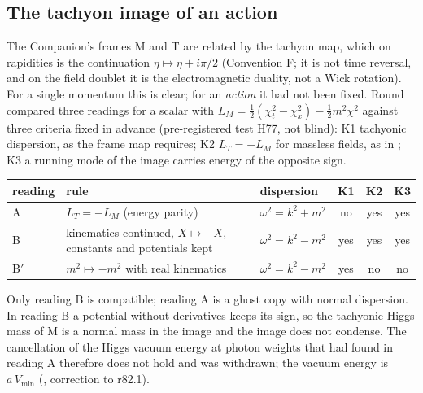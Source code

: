 \subsection{The tachyon image of an action}
\label{sec:act-image}

The Companion's frames M and T are related by the tachyon map, which on rapidities is the continuation
$\eta\mapsto\eta+i\pi/2$ (Convention F; it is not time reversal, and on the field doublet it is the electromagnetic
duality, not a Wick rotation). For a single momentum this is clear; for an \emph{action} it had not been fixed. Round
 compared three readings for a scalar with $L_M=\tfrac12(\chi_t^2-\chi_x^2)-\tfrac12m^2\chi^2$ against three
criteria fixed in advance (pre-registered test H77, not blind): K1 tachyonic dispersion, as the frame map requires;
K2 $L_T=-L_M$ for massless fields, as in ; K3 a running mode of the image carries energy of the opposite sign.

\begin{center}
\small
\begin{tabular}{@{}l>{\raggedright\arraybackslash}p{}lccc@{}}
\toprule
reading & rule & dispersion & K1 & K2 & K3\\
\midrule
A & $L_T=-L_M$ (energy parity) & $\omega^2=k^2+m^2$ & no & yes & yes\\
B & kinematics continued, $X\mapsto-X$, constants and potentials kept & $\omega^2=k^2-m^2$ & yes & yes & yes\\
B$'$ & $m^2\mapsto-m^2$ with real kinematics & $\omega^2=k^2-m^2$ & yes & no & no\\
\bottomrule
\end{tabular}
\end{center}

\noindent Only reading B is compatible; reading A is a ghost copy with normal dispersion. In reading B a potential without
derivatives keeps its sign, so the tachyonic Higgs mass of M is a normal mass in the image and the image does not
condense. The cancellation of the Higgs vacuum energy at photon weights that  had found in reading A
therefore does not hold and was withdrawn; the vacuum energy is $a\,V_{\min}$ (, correction to r82.1).

